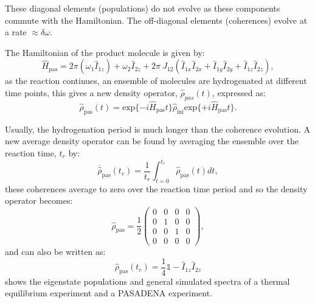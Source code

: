  These diagonal elements (populations) do not evolve as these components commute with the Hamiltonian. The off-diagonal
 elements (coherences) evolve at a rate $\approx\delta{\omega}$.

The Hamiltonian of the product molecule is given by:
\begin{equation}
  \hat{H}_{\text{pas}} = 2\pi(\omega_1\hat{I}_{1z}) + \omega_2\hat{I}_{2z} + 2\pi~J_{12}(\hat{I}_{1x}\hat{I}_{2x} + \hat{I}_{1y}\hat{I}_{2y} + \hat{I}_{1z}\hat{I}_{2z}),
\end{equation}
 as the reaction continues, an ensemble of molecules are hydrogenated at different time points, this gives
 a new density operator, $\hat{\rho}_{pas}(t)$, expressed as:
 \begin{equation}
   \hat{\rho}_{\text{pas}}(t) = \text{exp}\{-i\hat{H}_{\text{pas}}t\}\hat{\rho}_{\text{ini}}\text{exp}\{+i\hat{H}_{\text{pas}}t\}.
 \end{equation}

Usually, the hydrogenation period is much longer than the coherence evolution. A new average density operator
can be found by averaging the ensemble over the reaction time, $t_r$ by:
\begin{equation}
  \overbar{\hat{\rho}}_{\text{pas}}(t_r) = \frac{1}{t_r}\int_{t=0}^{t_r}\hat{\rho}_{\text{pas}}(t)dt,
\end{equation}
these coherences average to zero over the reaction time period and so the
 density operator becomes:
 \begin{equation}
   \hat{\rho}_{\text{pas}} = \frac{1}{2}\begin{pmatrix}
   0 & 0 & 0 & 0\\
   0 & 1 & 0 & 0\\
   0 & 0 & 1 & 0\\
   0 & 0 & 0 & 0
 \end{pmatrix},
 \end{equation}
and can also be written as:
\begin{equation}
   \hat{\rho}_{\text{pas}}(t_r) = \frac{1}{4}\mathbb{1} - \hat{I}_{1z}\hat{I}_{2z}
\end{equation}
  shows the eigenstate populations and general simulated spectra of a thermal equilibrium experiment and
 a PASADENA experiment.

